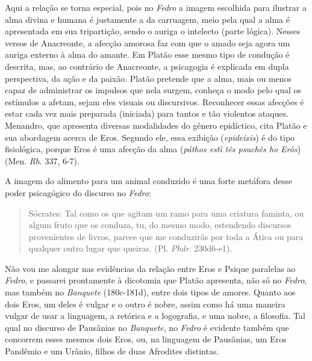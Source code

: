 

Aqui a relação se torna especial, pois no \emph{Fedro} a imagem
escolhida para ilustrar a alma divina e humana é justamente a da
carruagem, meio pela qual a alma é apresentada em sua tripartição, sendo
o auriga o intelecto (parte lógica). Nesses versos de Anacreonte, a
afecção amorosa faz com que o amado seja agora um auriga externo à alma
do amante. Em Platão esse mesmo tipo de condução é descrita, mas, ao
contrário de Anacreonte, a psicagogia é explicada em dupla perspectiva,
da ação e da paixão. Platão pretende que a alma, mais ou menos capaz de
administrar os impulsos que nela surgem, conheça o modo pelo qual os
estímulos a afetam, sejam eles visuais ou discursivos. Reconhecer essas
afecções é estar cada vez mais preparada (iniciada) para tantos e tão
violentos ataques. Menandro, que apresenta diversas modalidades do
gênero epidíctico, cita Platão e sua abordagem acerca de Eros. Segundo
ele, essa exibição (\emph{epideixis}) é do tipo fisiológica, porque Eros
é uma afecção da alma (\emph{páthos estì tês psuchês ho Erôs})
(Men. \emph{Rh}. 337, 6-7).

A imagem do alimento para um animal conduzido é uma forte metáfora desse
poder psicagógico do discurso no \emph{Fedro}:

 

\begin{quote}
Sócrates: \redondo{[…]} Tal como os que agitam um ramo para uma
criatura faminta, ou algum fruto que os conduza, tu, do mesmo modo,
estendendo discursos provenientes de livros, parece que me conduzirás
por toda a Ática ou para qualquer outro lugar que queiras.
(Pl. \emph{Phdr}. 230d6-e1).
\end{quote}

 

Não vou me alongar nas evidências da relação entre Eros e Psique
paralelas ao \emph{Fedro}, e passarei prontamente à dicotomia que Platão
apresenta, não só no \emph{Fedro}, mas também
no \emph{Banquete }(180c-181d), entre dois tipos de amores. Quanto aos
dois Eros, um deles é vulgar e o outro é nobre, assim como há uma maneira
vulgar de usar a linguagem, a retórica e a logografia, e uma nobre, a
filosofia. Tal qual no discurso de Pausânias no \emph{Banquete},
no \emph{Fedro} é evidente também que concorrem esses mesmos dois Eros,
ou, na linguagem de Pausânias, um Eros Pandêmio e um Urânio, filhos de
duas Afrodites distintas.


